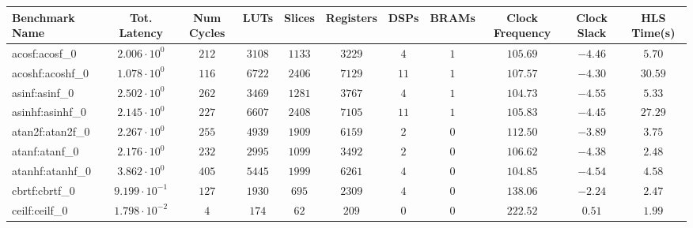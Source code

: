 \begin{tabular}{|l|c|c|c|c|c|c|c|c|c|c|}
\hline
Benchmark Name               & Tot. Latency            & Num Cycles & LUTs       & Slices    & Registers  & DSPs    & BRAMs & Clock Frequency & Clock Slack & HLS Time(s) \\
\hline
acosf:acosf\_0               & $ 2.006 \cdot 10^{0}  $ & $ 212    $ & $ 3108   $ & $ 1133  $ & $ 3229   $ & $ 4   $ & $ 1 $ & $ 105.69      $ & $ -4.46   $ & $ 5.70    $ \\
acoshf:acoshf\_0             & $ 1.078 \cdot 10^{0}  $ & $ 116    $ & $ 6722   $ & $ 2406  $ & $ 7129   $ & $ 11  $ & $ 1 $ & $ 107.57      $ & $ -4.30   $ & $ 30.59   $ \\
asinf:asinf\_0               & $ 2.502 \cdot 10^{0}  $ & $ 262    $ & $ 3469   $ & $ 1281  $ & $ 3767   $ & $ 4   $ & $ 1 $ & $ 104.73      $ & $ -4.55   $ & $ 5.33    $ \\
asinhf:asinhf\_0             & $ 2.145 \cdot 10^{0}  $ & $ 227    $ & $ 6607   $ & $ 2408  $ & $ 7105   $ & $ 11  $ & $ 1 $ & $ 105.83      $ & $ -4.45   $ & $ 27.29   $ \\
atan2f:atan2f\_0             & $ 2.267 \cdot 10^{0}  $ & $ 255    $ & $ 4939   $ & $ 1909  $ & $ 6159   $ & $ 2   $ & $ 0 $ & $ 112.50      $ & $ -3.89   $ & $ 3.75    $ \\
atanf:atanf\_0               & $ 2.176 \cdot 10^{0}  $ & $ 232    $ & $ 2995   $ & $ 1099  $ & $ 3492   $ & $ 2   $ & $ 0 $ & $ 106.62      $ & $ -4.38   $ & $ 2.48    $ \\
atanhf:atanhf\_0             & $ 3.862 \cdot 10^{0}  $ & $ 405    $ & $ 5445   $ & $ 1999  $ & $ 6261   $ & $ 4   $ & $ 0 $ & $ 104.85      $ & $ -4.54   $ & $ 4.58    $ \\
cbrtf:cbrtf\_0               & $ 9.199 \cdot 10^{-1} $ & $ 127    $ & $ 1930   $ & $ 695   $ & $ 2309   $ & $ 4   $ & $ 0 $ & $ 138.06      $ & $ -2.24   $ & $ 2.47    $ \\
ceilf:ceilf\_0               & $ 1.798 \cdot 10^{-2} $ & $ 4      $ & $ 174    $ & $ 62    $ & $ 209    $ & $ 0   $ & $ 0 $ & $ 222.52      $ & $ 0.51    $ & $ 1.99    $ \\

\end{tabular}
